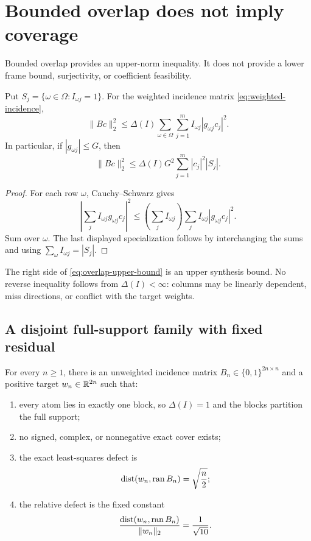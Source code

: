\section{Bounded overlap does not imply coverage}
\label{sec:counterexamples}

Bounded overlap provides an upper-norm inequality.  It does not
provide a lower frame bound, surjectivity, or coefficient feasibility.

\begin{lemma}
\label{lem:overlap-upper-bound}
Put \(S_j=\{\omega\in\Omega:I_{\omega j}=1\}\).  For the weighted
incidence matrix \eqref{eq:weighted-incidence},
\begin{equation}
 \|Bc\|_2^2
 \le
 \Delta(I)
 \sum_{\omega\in\Omega}\sum_{j=1}^m
 I_{\omega j}|g_{\omega j}c_j|^2.
 \label{eq:overlap-upper-bound}
\end{equation}
In particular, if \(|g_{\omega j}|\le G\), then
\[
 \|Bc\|_2^2
 \le
 \Delta(I)G^2
 \sum_{j=1}^m |c_j|^2|S_j|.
\]
\end{lemma}

\begin{proof}
For each row \(\omega\), Cauchy--Schwarz gives
\[
 \left|
 \sum_j I_{\omega j}g_{\omega j}c_j
 \right|^2
 \le
 \left(\sum_jI_{\omega j}\right)
 \sum_jI_{\omega j}|g_{\omega j}c_j|^2.
\]
Sum over \(\omega\).  The last displayed specialization follows by
interchanging the sums and using
\(\sum_\omega I_{\omega j}=|S_j|\).
\end{proof}

\begin{remark}
The right side of \eqref{eq:overlap-upper-bound} is an upper synthesis
bound.  No reverse inequality follows from \(\Delta(I)<\infty\):
columns may be linearly dependent, miss directions, or conflict with
the target weights.
\end{remark}

\subsection{A disjoint full-support family with fixed residual}

\begin{theorem}
\label{thm:partition-counterexample}
For every \(n\ge1\), there is an unweighted incidence matrix
\(B_n\in\{0,1\}^{2n\times n}\) and a positive target
\(w_n\in\mathbb R^{2n}\) such that:
\begin{enumerate}[label=(\roman*),leftmargin=2.2em]
\item every atom lies in exactly one block, so
  \(\Delta(I)=1\) and the blocks partition the full support;
\item no signed, complex, or nonnegative exact cover exists;
\item the exact least-squares defect is
  \[
  \operatorname{dist}(w_n,\operatorname{ran} B_n)=\sqrt{\frac n2};
  \]
\item the relative defect is the fixed constant
  \[
  \frac{\operatorname{dist}(w_n,\operatorname{ran} B_n)}{\|w_n\|_2}
  =\frac1{\sqrt{10}}.
  \]
\end{enumerate}
\end{theorem}

